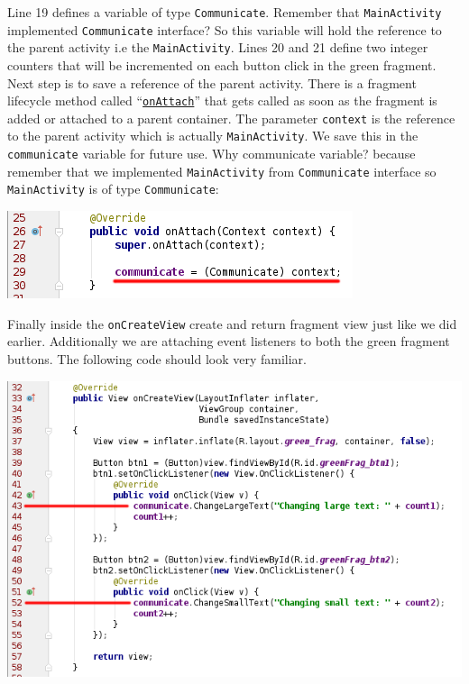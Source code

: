 Line 19 defines a variable of type \texttt{Communicate}. Remember that \texttt{MainActivity} implemented \texttt{Communicate} interface? So this variable will hold the reference to the parent activity i.e the \texttt{MainActivity}. Lines 20 and 21 define two integer counters that will be incremented on each button click in the green fragment. \\

Next step is to save a reference of the parent activity. There is a fragment lifecycle method called ``\href{https://developer.android.com/reference/android/app/Fragment.html#onAttach(android.app.Activity)}{\texttt{onAttach}}'' that gets called as soon as the fragment is added or attached to a parent container. The parameter \texttt{context} is the reference to the parent activity which is actually \texttt{MainActivity}. We save this in the \texttt{communicate} variable for future use. Why communicate variable? because remember that we implemented \texttt{MainActivity} from \texttt{Communicate} interface so \texttt{MainActivity} is of type \texttt{Communicate}: 

\begin{center}
	\includegraphics[scale=\SourceCodeScale]{chapters/ch11/images/29}
\end{center}

Finally inside the \texttt{onCreateView} create and return fragment view just like we did earlier. Additionally we are attaching event listeners to both the green fragment buttons. The following code should look very familiar.

\begin{center}
	\includegraphics[scale=\SourceCodeScale]{chapters/ch11/images/30}
\end{center}

